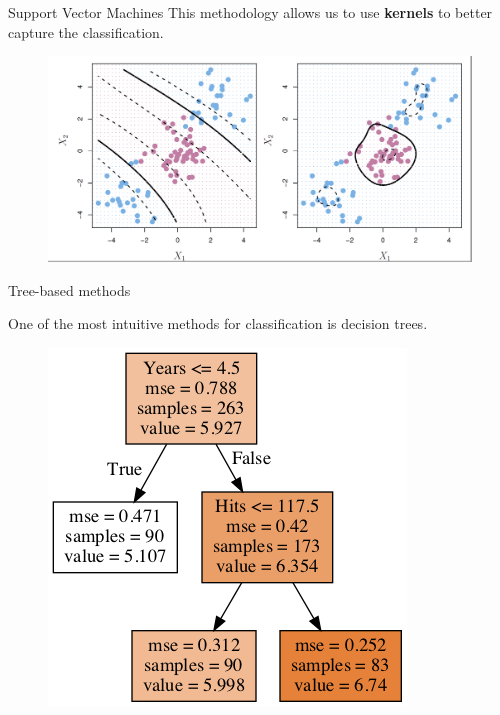\documentclass[11pt, aspectratio=43]{beamer}
\begin{document}
\begin{frame}{Support Vector Machines}
	This methodology allows us to use \textbf{kernels} to better capture the classification.
\begin{figure}[h]
	\centering
	\includegraphics[scale=0.25]{Figures/fig_kernels_svm.png}
\end{figure}		
	

\end{frame}

\begin{frame}{Tree-based methods}

One of the most intuitive methods for classification is decision trees. 
\begin{figure}[h]
	\centering
	\includegraphics[scale=0.45]{Figures/fig_hitters.png}
\end{figure}		

\end{frame}
\end{document}
